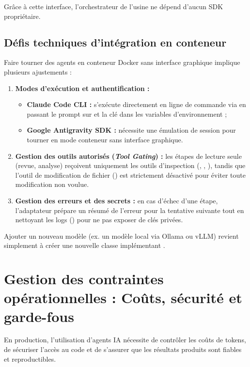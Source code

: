 \documentclass{tnreport}
\begin{document}
Grâce à cette interface, l'orchestrateur de l'usine ne dépend d'aucun SDK propriétaire.

\subsection{Défis techniques d'intégration en conteneur}
\label{subsec:defis_abstraction_llm}

Faire tourner des agents en conteneur Docker sans interface graphique implique plusieurs ajustements :
\begin{enumerate}
    \item \textbf{Modes d'exécution et authentification :}
    \begin{itemize}
        \item \textbf{Claude Code CLI :} s'exécute directement en ligne de commande via  en passant le prompt sur  et la clé dans les variables d'environnement ;
        \item \textbf{Google Antigravity SDK :} nécessite une émulation de session pour tourner en mode conteneur sans interface graphique.
    \end{itemize}
    \item \textbf{Gestion des outils autorisés (\textit{Tool Gating}) :}
    les étapes de lecture seule (revue, analyse) reçoivent uniquement les outils d'inspection (, , ), tandis que l'outil de modification de fichier () est strictement désactivé pour éviter toute modification non voulue.
    \item \textbf{Gestion des erreurs et des secrets :}
    en cas d'échec d'une étape, l'adaptateur prépare un résumé de l'erreur pour la tentative suivante tout en nettoyant les logs () pour ne pas exposer de clés privées.
\end{enumerate}

Ajouter un nouveau modèle (ex. un modèle local via Ollama ou vLLM) revient simplement à créer une nouvelle classe implémentant .

\section{Gestion des contraintes opérationnelles : Coûts, sécurité et garde-fous}
\label{sec:analyse_contraintes}

En production, l'utilisation d'agents IA nécessite de contrôler les coûts de tokens, de sécuriser l'accès au code et de s'assurer que les résultats produits sont fiables et reproductibles.
\end{document}

